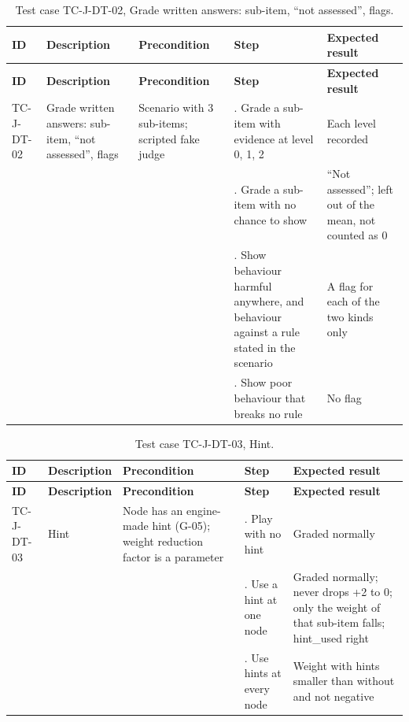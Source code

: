 {\small
\begin{longtable}{|>{\raggedright\arraybackslash}p{}|>{\raggedright\arraybackslash}p{}|>{\raggedright\arraybackslash}p{}|>{\raggedright\arraybackslash}p{}|>{\raggedright\arraybackslash}p{}|}
\caption{Test case TC-J-DT-02, Grade written answers: sub-item, ``not assessed'', flags.} \\
\hline
\textbf{ID} & \textbf{Description} & \textbf{Precondition} & \textbf{Step} & \textbf{Expected result} \\ \hline
\endfirsthead
\hline
\textbf{ID} & \textbf{Description} & \textbf{Precondition} & \textbf{Step} & \textbf{Expected result} \\ \hline
\endhead
TC-J-DT-02 & Grade written answers: sub-item, ``not assessed'', flags & Scenario with 3 sub-items; scripted fake judge & 1. Grade a sub-item with evidence at level 0, 1, 2 & Each level recorded \\ \hline
 &  &  & 2. Grade a sub-item with no chance to show & ``Not assessed''; left out of the mean, not counted as 0 \\ \hline
 &  &  & 3. Show behaviour harmful anywhere, and behaviour against a rule stated in the scenario & A flag for each of the two kinds only \\ \hline
 &  &  & 4. Show poor behaviour that breaks no rule & No flag \\ \hline
\end{longtable}
}

{\small
\begin{longtable}{|>{\raggedright\arraybackslash}p{}|>{\raggedright\arraybackslash}p{}|>{\raggedright\arraybackslash}p{}|>{\raggedright\arraybackslash}p{}|>{\raggedright\arraybackslash}p{}|}
\caption{Test case TC-J-DT-03, Hint.} \\
\hline
\textbf{ID} & \textbf{Description} & \textbf{Precondition} & \textbf{Step} & \textbf{Expected result} \\ \hline
\endfirsthead
\hline
\textbf{ID} & \textbf{Description} & \textbf{Precondition} & \textbf{Step} & \textbf{Expected result} \\ \hline
\endhead
TC-J-DT-03 & Hint & Node has an engine-made hint (G-05); weight reduction factor is a parameter & 1. Play with no hint & Graded normally \\ \hline
 &  &  & 2. Use a hint at one node & Graded normally; never drops +2 to 0; only the weight of that sub-item falls; hint\_used right \\ \hline
 &  &  & 3. Use hints at every node & Weight with hints smaller than without and not negative \\ \hline
\end{longtable}
}


